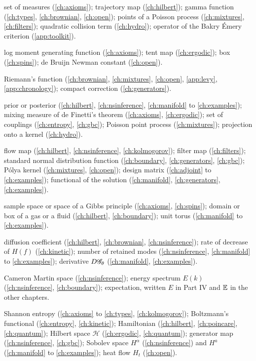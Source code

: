 \begin{description}[leftmargin=2.2em,labelwidth=1.8em,labelsep=0.4em,itemsep=0pt,parsep=0pt]
\item[$\Gamma$] set of measures (\ref{ch:axioms}); trajectory map (\ref{ch:hilbert}); gamma function (\ref{ch:types}, \ref{ch:brownian}, \ref{ch:open}); points of a Poisson process (\ref{ch:mixtures}, \ref{ch:filters}); quadratic collision term (\ref{ch:hydro}); operator of the Bakry \'Emery criterion (\ref{app:toolkit}).
\item[$\Lambda$] log moment generating function (\ref{ch:axioms}); tent map (\ref{ch:ergodic}); box (\ref{ch:spins}); de Bruijn Newman constant (\ref{ch:open}).
\item[$\Xi$] Riemann's function (\ref{ch:brownian}, \ref{ch:mixtures}, \ref{ch:open}, \ref{app:levy}, \ref{app:chronology}); compact correction (\ref{ch:generators}).
\item[$\Pi$] prior or posterior (\ref{ch:hilbert}, \ref{ch:nsinference}, \ref{ch:manifold} to \ref{ch:examples}); mixing measure of de Finetti's theorem (\ref{ch:axioms}, \ref{ch:ergodic}); set of couplings (\ref{ch:entropy}, \ref{ch:gbc}); Poisson point process (\ref{ch:mixtures}); projection onto a kernel (\ref{ch:hydro}).
\item[$\Phi$] flow map (\ref{ch:hilbert}, \ref{ch:nsinference}, \ref{ch:kolmogorov}); filter map (\ref{ch:filters}); standard normal distribution function (\ref{ch:boundary}, \ref{ch:generators}, \ref{ch:gbc}); P\'olya kernel (\ref{ch:mixtures}, \ref{ch:open}); design matrix (\ref{ch:adjoint} to \ref{ch:examples}); functional of the solution (\ref{ch:manifold}, \ref{ch:generators}, \ref{ch:examples}).
\item[$\Omega$] sample space or space of a Gibbs principle (\ref{ch:axioms}, \ref{ch:spins}); domain or box of a gas or a fluid (\ref{ch:hilbert}, \ref{ch:boundary}); unit torus (\ref{ch:manifold} to \ref{ch:examples}).
\item[$D$] diffusion coefficient (\ref{ch:hilbert}, \ref{ch:brownian}, \ref{ch:nsinference}); rate of decrease of $H(f)$ (\ref{ch:kinetic}); number of retained modes (\ref{ch:nsinference}, \ref{ch:manifold} to \ref{ch:examples}); derivative $D\mathscr{G}_\theta$ (\ref{ch:manifold}, \ref{ch:examples}).
\item[$E$] Cameron Martin space (\ref{ch:nsinference}); energy spectrum $E(k)$ (\ref{ch:nsinference}, \ref{ch:boundary}); expectation, written $E$ in Part IV and $\mathbb{E}$ in the other chapters.
\item[$H$] Shannon entropy (\ref{ch:axioms} to \ref{ch:types}, \ref{ch:kolmogorov}); Boltzmann's functional (\ref{ch:entropy}, \ref{ch:kinetic}); Hamiltonian (\ref{ch:hilbert}, \ref{ch:poincare}, \ref{ch:quantum}); Hilbert space $\mathcal H$ (\ref{ch:ergodic}, \ref{ch:quantum}); generator map (\ref{ch:nsinference}, \ref{ch:gbc}); Sobolev space $H^\alpha$ (\ref{ch:nsinference}) and $H^a$ (\ref{ch:manifold} to \ref{ch:examples}); heat flow $H_t$ (\ref{ch:open}).

\end{description}
